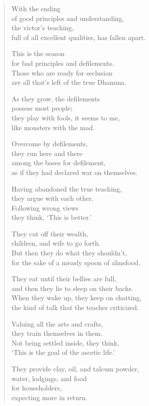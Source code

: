 \documentclass[12pt,openany]{book}%
\begin{document}
\begin{verse}
With the ending \\
of good principles and understanding, \\
the victor’s teaching, \\
full of all excellent qualities, has fallen apart. 

This is the season \\
for bad principles and defilements. \\
Those who are ready for seclusion \\
are all that’s left of the true Dhamma. 

As they grow, the defilements \\
possess most people; \\
they play with fools, it seems to me, \\
like monsters with the mad. 

Overcome by defilements, \\
they run here and there \\
among the bases for defilement, \\
as if they had declared war on themselves. 

Having abandoned the true teaching, \\
they argue with each other. \\
Following wrong views \\
they think, ‘This is better.’ 

They cut off their wealth, \\
children, and wife to go forth. \\
But then they do what they shouldn’t, \\
for the sake of a measly spoon of almsfood. 

They eat until their bellies are full, \\
and then they lie to sleep on their backs. \\
When they wake up, they keep on chatting, \\
the kind of talk that the teacher criticized. 

Valuing all the arts and crafts, \\
they train themselves in them. \\
Not being settled inside, they think, \\
‘This is the goal of the ascetic life.’ 

They provide clay, oil, and talcum powder, \\
water, lodgings, and food \\
for householders, \\
expecting more in return. 


\end{verse}
\end{document}
